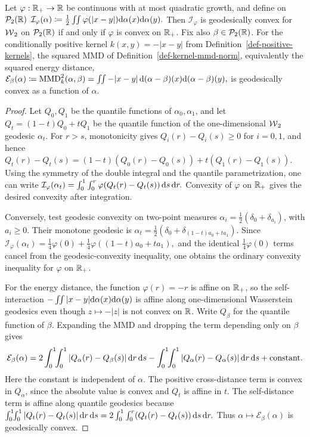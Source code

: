 \begin{prop}\label{prop-1d-interaction-halfline-convex}
Let \(\varphi:\mathbb{R}_+\to\mathbb{R}\) be continuous with at most quadratic growth, and define on \(\mathcal{P}_2(\mathbb{R})\)
\(\mathcal I_\varphi(\alpha) \coloneqq \frac12\iint \varphi(|x-y|)\mathrm{d}\alpha(x)\mathrm{d}\alpha(y).\)
Then \(\mathcal I_\varphi\) is geodesically convex for \(\operatorname{\mathcal{W}}_2\) on \(\mathcal{P}_2(\mathbb{R})\) if and only if \(\varphi\) is convex on \(\mathbb{R}_+\).
Fix also \(\beta\in\mathcal{P}_2(\mathbb{R})\). For the conditionally positive kernel \(k(x,y)=-|x-y|\) from Definition~\ref{def-positive-kernels}, the squared MMD of Definition~\ref{def-kernel-mmd-norm}, equivalently the squared energy distance,
\(\mathcal E_\beta(\alpha) \coloneqq \operatorname{MMD}_k^2(\alpha,\beta) = \iint -|x-y|\,\mathrm{d}(\alpha-\beta)(x)\mathrm{d}(\alpha-\beta)(y),\)
is geodesically convex as a function of \(\alpha\).
\end{prop}
\begin{proof}
Let \(Q_0,Q_1\) be the quantile functions of \(\alpha_0,\alpha_1\), and let \(Q_t=(1-t)Q_0+tQ_1\) be the quantile function of the one-dimensional \(\operatorname{\mathcal{W}}_2\) geodesic \(\alpha_t\). For \(r>s\), monotonicity gives \(Q_i(r)-Q_i(s)\geq0\) for \(i=0,1\), and hence
\(Q_t(r)-Q_t(s) = (1-t)(Q_0(r)-Q_0(s))+t(Q_1(r)-Q_1(s)).\)
Using the symmetry of the double integral and the quantile parametrization, one can write
\(\mathcal I_\varphi(\alpha_t) = \int_0^1\int_0^r \varphi(Q_t(r)-Q_t(s))\,\mathrm{d} s\,\mathrm{d} r.\)
Convexity of \(\varphi\) on \(\mathbb{R}_+\) gives the desired convexity after integration.

Conversely, test geodesic convexity on two-point measures \(\alpha_i=\frac12(\delta_0+\delta_{a_i})\), with \(a_i\geq0\). Their monotone geodesic is \(\alpha_t=\frac12(\delta_0+\delta_{(1-t)a_0+t a_1})\). Since
\(\mathcal I_\varphi(\alpha_t) = \frac14\varphi(0)+\frac14\varphi((1-t)a_0+t a_1),\)
and the identical \(\frac14\varphi(0)\) terms cancel from the geodesic-convexity inequality, one obtains the ordinary convexity inequality for \(\varphi\) on \(\mathbb{R}_+\).

For the energy distance, the function \(\varphi(r)=-r\) is affine on \(\mathbb{R}_+\), so the self-interaction \(-\iint |x-y|\mathrm{d}\alpha(x)\mathrm{d}\alpha(y)\) is affine along one-dimensional Wasserstein geodesics even though \(z\mapsto-|z|\) is not convex on \(\mathbb{R}\). Write \(Q_\beta\) for the quantile function of \(\beta\). Expanding the MMD and dropping the term depending only on \(\beta\) gives
\[
\mathcal E_\beta(\alpha)
=
2\int_0^1\!\!\int_0^1 |Q_\alpha(r)-Q_\beta(s)|\,\mathrm{d} r\,\mathrm{d} s
-
\int_0^1\!\!\int_0^1 |Q_\alpha(r)-Q_\alpha(s)|\,\mathrm{d} r\,\mathrm{d} s
+\mathrm{constant}.
\]
Here the constant is independent of \(\alpha\). The positive cross-distance term is convex in \(Q_\alpha\), since the absolute value is convex and \(Q_t\) is affine in \(t\). The self-distance term is affine along quantile geodesics because
\(\int_0^1\!\!\int_0^1 |Q_t(r)-Q_t(s)|\,\mathrm{d} r\,\mathrm{d} s = 2\int_0^1\int_0^r (Q_t(r)-Q_t(s))\,\mathrm{d} s\,\mathrm{d} r.\)
Thus \(\alpha\mapsto\mathcal E_\beta(\alpha)\) is geodesically convex.
\end{proof}
